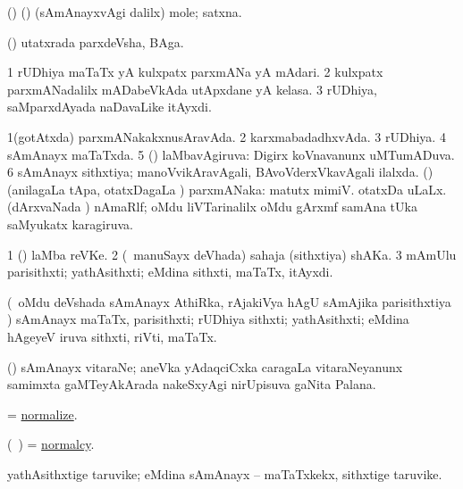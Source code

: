 \bentry
{}
\gl{\nA}
\bmng
(\AseTxrXV) (\ashi) (sAmAnayxvAgi \bava dalilx) mole; satxna. 
\emng
\eentry

\bentry
{}
\gl{\nA}
\bmng
(\birx) utatxrada parxdeVsha, BAga. 
\emng
\eentry

\bentry
{}
\gl{\nA}
\bmng
\bnum
\num{1} rUDhiya maTaTx yA kulxpatx parxmANa yA mAdari. 
\num{2} kulxpatx parxmANadalilx mADabeVkAda utApxdane yA kelasa. 
\num{3} rUDhiya, saMparxdAyada naDavaLike itAyxdi. 
\enum
\emng
\eentry

\bentry
{}
\gl{\gu}
\bmng
\bnum
\num{1}(gotAtxda) parxmANakakxnusAravAda. 
\num{2} karxmabadadhxvAda. 
\num{3} rUDhiya. 
\num{4} sAmAnayx maTaTxda. 
\num{5} (\jAyx) laMbavAgiruva:  Digirx koVnavanunx uMTumADuva. 
\num{6} sAmAnayx sithxtiya; manoVvikAravAgali, BAvoVderxVkavAgali ilalxda. 
 (\ravi) 
\banum
{} (anilagaLa tApa, otatxDagaLa \vi) parxmANaka:  matutx  mimiV. otatxDa uLaLx. 
 (dArxvaNada \vi) nAmaRlf; oMdu liVTarinalilx oMdu gArxmf samAna tUka saMyukatx karagiruva. 
\eanum
\numie
\enum
\emng
\eentry

\bentry
{}
\gl{\nA}
\bmng
\bnum
\num{1} (\jAyx) laMba reVKe. 
\num{2} (\kanmu\ manuSayx deVhada) sahaja (sithxtiya) shAKa. 
\num{3} mAmUlu parisithxti; yathAsithxti; eMdina sithxti, maTaTx, itAyxdi. 
\enum
\emng
\eentry

\bentry
{}
\gl{\nA}
\bmng
(\kanmu\ oMdu deVshada sAmAnayx AthiRka, rAjakiVya hAgU sAmAjika parisithxtiya \vi) sAmAnayx maTaTx, parisithxti; rUDhiya sithxti; yathAsithxti; eMdina hAgeyeV iruva sithxti, riVti, maTaTx. 
\emng
\eentry

\bentry
{}
\gl{\nA}
\bmng
(\saMshA) sAmAnayx vitaraNe; aneVka yAdaqciCxka caragaLa vitaraNeyanunx samimxta gaMTeyAkArada nakeSxyAgi nirUpisuva gaNita Palana. 
\emng
\eentry

\bentry
{}
\gl{\kirx}
\bmng
= \hyperlink{normalize}{normalize}. 
\emng
\eentry

\bentry
{}
\gl{\nA}
\bmng
(\kanmu\ \ame) = \hyperlink{normalcy}{normalcy}. 
\emng
\eentry

\bentry
{}
\gl{\nA}
\bmng
yathAsithxtige taruvike; eMdina sAmAnayx -- maTaTxkekx, sithxtige taruvike. 
\emng
\eentry

